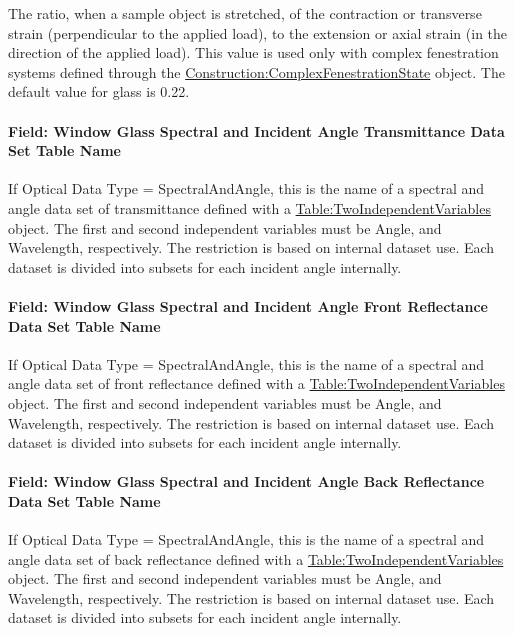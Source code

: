 The ratio, when a sample object is stretched, of the contraction or transverse strain (perpendicular to the applied load), to the extension or axial strain (in the direction of the applied load). This value is used only with complex fenestration systems defined through the \hyperref[constructioncomplexfenestrationstate]{Construction:ComplexFenestrationState} object. The default value for glass is 0.22.

\paragraph{Field: Window Glass Spectral and Incident Angle Transmittance Data Set Table Name}\label{field-window-glass-spectral-and-incident-angle-transmittance-data}

If Optical Data Type = SpectralAndAngle, this is the name of a spectral and angle data set of transmittance defined with a \hyperref[tabletwoindependentvariables]{Table:TwoIndependentVariables} object. The first and second independent variables must be Angle, and Wavelength, respectively. The restriction is based on internal dataset use. Each dataset is divided into subsets for each incident angle internally.

\paragraph{Field: Window Glass Spectral and Incident Angle Front Reflectance Data Set Table Name}\label{field-window-glass-spectral-and-incident-angle-front-reflectance-data}

If Optical Data Type = SpectralAndAngle, this is the name of a spectral and angle data set of front reflectance defined with a \hyperref[tabletwoindependentvariables]{Table:TwoIndependentVariables} object. The first and second independent variables must be Angle, and Wavelength, respectively. The restriction is based on internal dataset use. Each dataset is divided into subsets for each incident angle internally.

\paragraph{Field: Window Glass Spectral and Incident Angle Back Reflectance Data Set Table Name}\label{field-window-glass-spectral-and-incident-angle-back-reflectance-data}

If Optical Data Type = SpectralAndAngle, this is the name of a spectral and angle data set of back reflectance defined with a \hyperref[tabletwoindependentvariables]{Table:TwoIndependentVariables} object. The first and second independent variables must be Angle, and Wavelength, respectively. The restriction is based on internal dataset use. Each dataset is divided into subsets for each incident angle internally.

